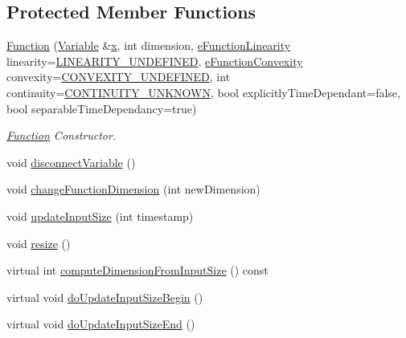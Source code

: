 \subsection*{Protected Member Functions}
\begin{DoxyCompactItemize}
\item 
\hyperlink{classocra_1_1Function_a34f827361369b0e38802fbc93a055014}{Function} (\hyperlink{classocra_1_1Variable}{Variable} \&\hyperlink{classocra_1_1Function_a28825886d1f149c87b112ec2ec1dd486}{x}, int dimension, \hyperlink{namespaceocra_a87b525b5508b0f6e9d931f14c7c226ab}{e\+Function\+Linearity} linearity=\hyperlink{namespaceocra_a87b525b5508b0f6e9d931f14c7c226abadd86a2dd3240e6df49a6e422b5abe075}{L\+I\+N\+E\+A\+R\+I\+T\+Y\+\_\+\+U\+N\+D\+E\+F\+I\+N\+ED}, \hyperlink{namespaceocra_ae6e8dca6121e9618486a449754876119}{e\+Function\+Convexity} convexity=\hyperlink{namespaceocra_ae6e8dca6121e9618486a449754876119a40aab88792841afe151808f879cfaa99}{C\+O\+N\+V\+E\+X\+I\+T\+Y\+\_\+\+U\+N\+D\+E\+F\+I\+N\+ED}, int continuity=\hyperlink{namespaceocra_ae5102ad1959d0c0dbf2eaa5610bbf728ad66557aadcf8856f9f135ff26db1a862}{C\+O\+N\+T\+I\+N\+U\+I\+T\+Y\+\_\+\+U\+N\+K\+N\+O\+WN}, bool explicitly\+Time\+Dependant=false, bool separable\+Time\+Dependancy=true)
\begin{DoxyCompactList}\small\item\em \hyperlink{classocra_1_1Function}{Function} Constructor. \end{DoxyCompactList}\item 
void \hyperlink{classocra_1_1Function_a0b0f0b2bf97e25130b51ed7b6c62c357}{disconnect\+Variable} ()
\item 
void \hyperlink{classocra_1_1Function_ad9800654d8a33fd91d7ea52038c2fb94}{change\+Function\+Dimension} (int new\+Dimension)
\item 
void \hyperlink{classocra_1_1Function_a3a5b9e6ae296339acc87ab2cbf97ef98}{update\+Input\+Size} (int timestamp)
\item 
void \hyperlink{classocra_1_1Function_aa59cd6d7965f6b2222261ef460d4899c}{resize} ()
\item 
virtual int \hyperlink{classocra_1_1Function_af8db22f8181f7fa0fcd1a2bbf7c3a12b}{compute\+Dimension\+From\+Input\+Size} () const 
\end{DoxyCompactItemize}
{\bf }\par
\begin{DoxyCompactItemize}
\item 
virtual void \hyperlink{classocra_1_1Function_a3f728f3758e6448aa59932853db5ddcc}{do\+Update\+Input\+Size\+Begin} ()
\item 
virtual void \hyperlink{classocra_1_1Function_a39f6d91b72eff2d32da7e4a85ee79f7d}{do\+Update\+Input\+Size\+End} ()
\end{DoxyCompactItemize}

